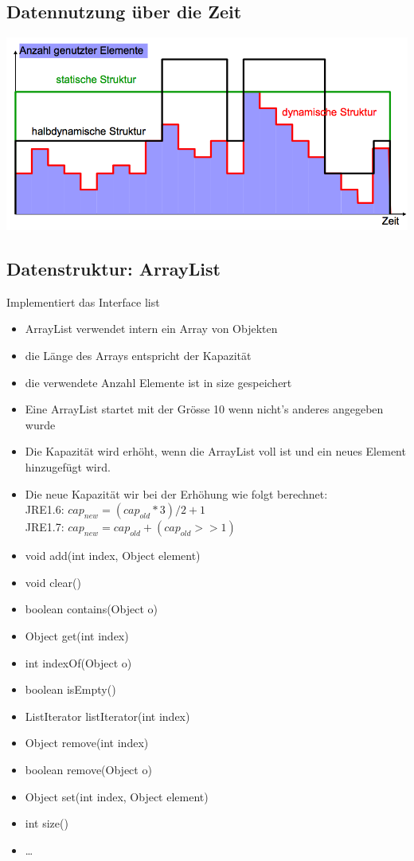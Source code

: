 \documentclass[a4paper,10pt]{article}
\begin{document}
\subsection{Datennutzung \"uber die Zeit}
\includegraphics[width=1\textwidth]{datennutzung_ueber_zeit.png}
\subsection{Datenstruktur: ArrayList}
Implementiert das Interface list
\begin{itemize} \setlength{\itemsep}{-2pt}
	\item ArrayList verwendet intern ein Array von Objekten
	\item die L\"ange des Arrays entspricht der Kapazit\"at
	\item die verwendete Anzahl Elemente ist in size gespeichert
	\item Eine ArrayList startet mit der Gr\"osse 10 wenn nicht's anderes angegeben wurde
	\item Die Kapazit\"at wird erh\"oht, wenn die ArrayList voll ist und ein neues Element hinzugef\"ugt wird.
	\item Die neue Kapazit\"at wir bei der Erh\"ohung wie folgt berechnet:\\
			JRE1.6: $cap_{new}=(cap_{old} * 3) / 2 + 1$\\
			JRE1.7: $cap_{new}=cap_{old} + (cap_{old} >> 1)$
\end{itemize}

\begin{itemize}
	\item void add(int index, Object element)
	\item void clear()
	\item boolean contains(Object o)
	\item Object get(int index)
	\item int indexOf(Object o)
	\item boolean isEmpty()
	\item ListIterator listIterator(int index)
	\item Object remove(int index)
	\item boolean remove(Object o)
	\item Object set(int index, Object element)
	\item int size()
	\item \dots
\end{itemize}
\end{document}

